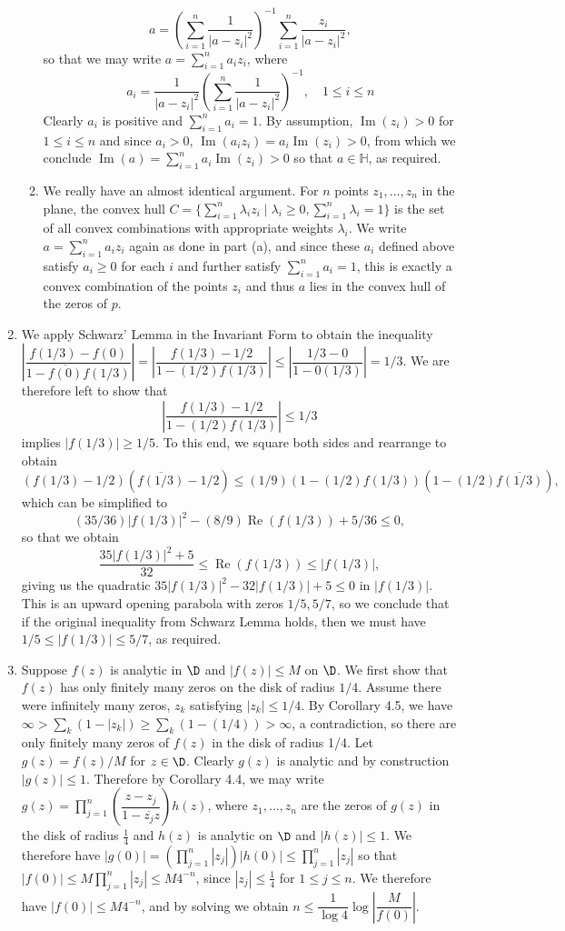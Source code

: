 \documentclass[11pt]{book}
\theoremstyle{definition}
\renewcommand{\H}{\mathbb{H}}
\renewcommand{\Re}{\operatorname{Re}}
\renewcommand{\Im}{\operatorname{Im}}
\begin{document}
\begin{enumerate}
\begin{enumerate}
\[
a=\left(\sum_{i=1}^n \dfrac{1}{|a-z_i|^2}\right)^{-1}\sum_{i=1}^n \dfrac{z_i}{|a-z_i|^2},
\]
so that we may write $a=\sum_{i=1}^n a_iz_i$, where 
\[
a_i=\dfrac{1}{|a-z_i|^2}\left(\sum_{i=1}^n \dfrac{1}{|a-z_i|^2}\right)^{-1}, \quad1\leq i\leq n
\] 
Clearly $a_i$ is positive and $\sum_{i=1}^n a_i=1$. By assumption, $\Im(z_i)>0$ for $1\leq i\leq n$ and since $a_i>0$, $\Im(a_iz_i)=a_i\Im(z_i)>0$, from which we conclude $\Im(a)=\sum_{i=1}^n a_i\Im(z_i)>0$ so that $a\in \H$, as required.
\item We really have an almost identical argument. For $n$ points $z_1,\dotsc,z_n$ in the plane, the convex hull $C=\{\sum_{i=1}^n \lambda_iz_i\mid \lambda_i\geq0, \sum_{i=1}^n \lambda_i = 1\}$ is the set of all convex combinations with appropriate weights $\lambda_i$. We write $a=\sum_{i=1}^n a_iz_i$ again as done in part (a), and since these $a_i$ defined above satisfy $a_i\geq0$ for each $i$ and further satisfy $\sum_{i=1}^n a_i=1$, this is exactly a convex combination of the points $z_i$ and thus $a$ lies in the convex hull of the zeros of $p$.
\end{enumerate}
%
%
\item We apply Schwarz' Lemma in the Invariant Form to obtain the inequality $\left|\dfrac{f(1/3)-f(0)}{1-\overline{f(0)}f(1/3)}\right|=\left|\dfrac{f(1/3)-1/2}{1-(1/2)f(1/3)}\right|\leq \left|\dfrac{1/3-0}{1-0(1/3)}\right|=1/3$. We are therefore left to show that
\[
\left|\dfrac{f(1/3)-1/2}{1-(1/2)f(1/3)}\right|\leq 1/3
\]
implies $|f(1/3)|\geq 1/5$. To this end, we square both sides and rearrange to obtain
\[
	(f(1/3)-1/2)(\overline{f(1/3)}-1/2)\leq (1/9)(1-(1/2)f(1/3))(1-(1/2)\overline{f(1/3)}),
\]
which can be simplified to
\[
	(35/36)|f(1/3)|^2 - (8/9)\Re(f(1/3)) + 5/36 \leq 0,
\]
so that we obtain
\[
\dfrac{35|f(1/3)|^2 + 5}{32} \leq \Re(f(1/3)) \leq |f(1/3)|,
\]
giving us the quadratic $35|f(1/3)|^2 - 32|f(1/3)| + 5 \leq 0$ in $|f(1/3)|$. This is an upward opening parabola with zeros $1/5, 5/7$, so we conclude that if the original inequality from Schwarz Lemma holds, then we must have $1/5\leq |f(1/3)|\leq 5/7$, as required.
%
%
\item Suppose $f(z)$ is analytic in $\D$ and $|f(z)|\leq M$ on $\D$. We first show that $f(z)$ has only finitely many zeros on the disk of radius $1/4$. Assume there were infinitely many zeros, $z_k$ satisfying $|z_k|\leq 1/4$. By Corollary 4.5, we have $\infty > \sum_{k} (1-|z_k|) \geq \sum_k (1-(1/4)) > \infty$, a contradiction, so there are only finitely many zeros of $f(z)$ in the disk of radius 1/4. Let $g(z)=f(z)/M$ for $z\in \D$. Clearly $g(z)$ is analytic and by construction $|g(z)|\leq 1$. Therefore by Corollary 4.4, we may write $g(z)=\displaystyle\prod_{j=1}^n \left(\dfrac{z-z_j}{1-\overline{z_j}z}\right)h(z)$, where $z_1,\dotsc,z_n$ are the zeros of $g(z)$ in the disk of radius $\frac{1}{4}$ and $h(z)$ is analytic on $\D$ and $|h(z)|\leq 1$. We therefore have $|g(0)|=(\displaystyle\prod_{j=1}^n |z_j|)|h(0)|\leq \prod_{j=1}^n|z_j|$ so that $|f(0)|\leq M\displaystyle\prod_{j=1}^n |z_j|\leq M4^{-n}$, since $|z_j|\leq \frac{1}{4}$ for $1\leq j\leq n$. We therefore have $|f(0)|\leq M4^{-n}$, and by solving we obtain $n\leq \dfrac{1}{\log4}\log\left|\dfrac{M}{f(0)}\right|$.
\end{enumerate}
\end{document}
